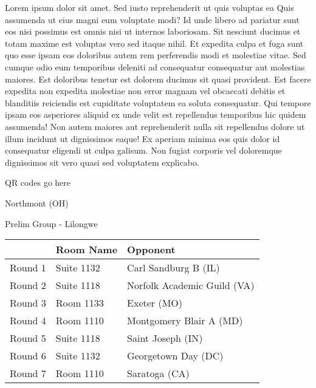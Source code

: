 \documentclass{article}%
\begin{document}
\vspace*{8pt}%
\linebreak%
\newline%
\newline%
Lorem ipsum dolor sit amet. Sed iusto reprehenderit ut quis voluptas ea Quis assumenda ut eius magni eum voluptate modi? Id unde libero ad pariatur sunt eos nisi possimus est omnis nisi ut internos laboriosam. Sit nesciunt ducimus et totam maxime est voluptas vero sed itaque nihil. Et expedita culpa et fuga sunt quo esse ipsam eos doloribus autem rem perferendis modi et molestiae vitae.\newline%
\newline%
Sed cumque odio eum temporibus deleniti ad consequatur consequatur aut molestias maiores. Est doloribus tenetur est dolorem ducimus sit quasi provident. Est facere expedita non expedita molestiae non error magnam vel obcaecati debitis et blanditiis reiciendis est cupiditate voluptatem ea soluta consequatur. Qui tempore ipsam eos asperiores aliquid ex unde velit est repellendus temporibus hic quidem assumenda!\newline%
\newline%
Non autem maiores aut reprehenderit nulla sit repellendus dolore ut illum incidunt ut dignissimos eaque! Ex aperiam minima eos quis dolor id consequatur eligendi ut culpa galisum. Non fugiat corporis vel doloremque dignissimos sit vero quasi sed voluptatem explicabo.\newline%
\newline%
%
\vspace*{30pt}%
\begin{center}%
\begin{Huge}%
QR codes go here%
\end{Huge}%
\end{center}%
\newpage%
%
\begin{center}%
\begin{Huge}%
Northmont (OH)%
\end{Huge}%
\vspace*{8pt}%
\linebreak%
\begin{Large}%
Prelim Group {-} Lilongwe%
\end{Large}%
\end{center}%
\begin{tabularx}{\textwidth}{|c|Y|Y|}%
\hline%
&Room Name&Opponent\\%
\hline%
Round 1&Suite 1132&Carl Sandburg B (IL)\\%
Round 2&Suite 1118&Norfolk Academic Guild (VA)\\%
Round 3&Room 1133&Exeter (MO)\\%
Round 4&Room 1110&Montgomery Blair A (MD)\\%
Round 5&Suite 1118&Saint Joseph (IN)\\%
Round 6&Suite 1132&Georgetown Day (DC)\\%
Round 7&Room 1110&Saratoga (CA)\\%
\hline%
\end{tabularx}%
\end{document}
